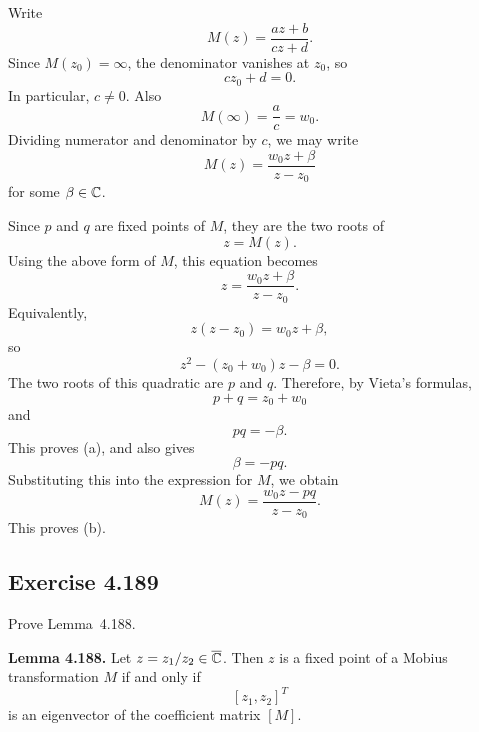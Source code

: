 \documentclass{article}
\providecommand{\Chat}{\overline{\C}}
\begin{document}
\begin{solution}
  Write
  \[
    M(z)=\frac{az+b}{cz+d}.
  \]
  Since $M(z_0)=\infty$, the denominator vanishes at $z_0$, so
  \[
    cz_0+d=0.
  \]
  In particular, $c\ne0$. Also
  \[
    M(\infty)=\frac ac=w_0.
  \]
  Dividing numerator and denominator by $c$, we may write
  \[
    M(z)=\frac{w_0z+\beta}{z-z_0}
  \]
  for some $\beta\in\mathbb{C}$.

  Since $p$ and $q$ are fixed points of $M$, they are the two roots of
  \[
    z=M(z).
  \]
  Using the above form of $M$, this equation becomes
  \[
    z=\frac{w_0z+\beta}{z-z_0}.
  \]
  Equivalently,
  \[
    z(z-z_0)=w_0z+\beta,
  \]
  so
  \[
    z^2-(z_0+w_0)z-\beta=0.
  \]
  The two roots of this quadratic are $p$ and $q$. Therefore, by Vieta's
  formulas,
  \[
    p+q=z_0+w_0
  \]
  and
  \[
    pq=-\beta.
  \]
  This proves (a), and also gives
  \[
    \beta=-pq.
  \]
  Substituting this into the expression for $M$, we obtain
  \[
    M(z)=\frac{w_0z-pq}{z-z_0}.
  \]
  This proves (b).
\end{solution}

\subsection{Exercise 4.189}

Prove Lemma~4.188.

\textbf{Lemma 4.188.}
Let $z=z_1/z_2\in\Chat$. Then $z$ is a fixed point of a Mobius
transformation $M$ if and only if
\[
  [z_1,z_2]^T
\]
is an eigenvector of the coefficient matrix $[M]$.
\end{document}
